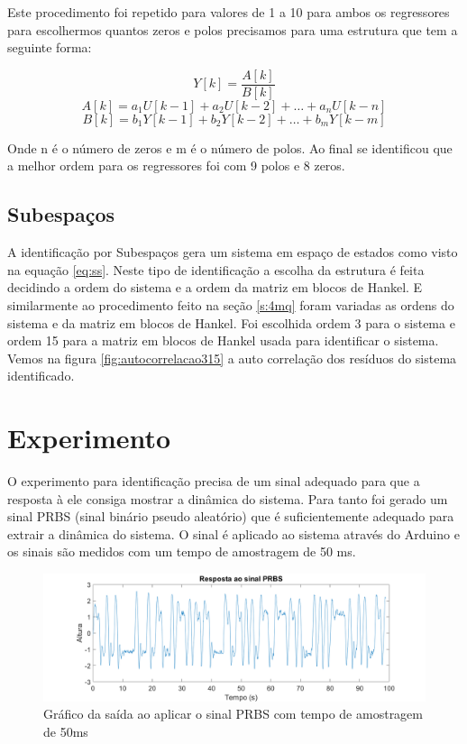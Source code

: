 Este procedimento foi repetido para valores de 1 a 10 para ambos os regressores para escolhermos quantos zeros e polos precisamos para uma estrutura que tem a seguinte forma:

\begin{equation}
Y[k]=\dfrac{A[k]}{B[k]}
\end{equation}
\begin{equation}
A[k]=a_1 U[k-1]+a_2 U[k-2]+ \dots + a_n U[k-n]
\end{equation}
\begin{equation}
B[k]=b_1 Y[k-1]+b_2 Y[k-2]+ \dots + b_m Y[k-m]
\end{equation}

Onde n é o número de zeros e m é o número de polos. Ao final se identificou que a melhor ordem para os regressores foi com 9 polos e 8 zeros.

\subsection{Subespaços}\label{s:4subespacos}
A identificação por Subespaços gera um sistema em espaço de estados como visto na equação \eqref{eq:ss}. Neste tipo de identificação a escolha da estrutura é feita decidindo a ordem do sistema e a ordem da matriz em blocos de Hankel. E similarmente ao procedimento feito na seção \ref{s:4mq} foram variadas as ordens do sistema e da matriz em blocos de Hankel.
Foi escolhida ordem 3 para o sistema e ordem 15 para a matriz em blocos de Hankel usada para identificar o sistema. Vemos na figura \ref{fig:autocorrelacao315} a auto correlação dos resíduos do sistema identificado.



\section{Experimento}\label{s:4experimento}
O experimento para identificação precisa de um sinal adequado para que a resposta à ele consiga mostrar a dinâmica do sistema. Para tanto foi gerado um sinal PRBS (sinal binário pseudo aleatório) que é suficientemente adequado para extrair a dinâmica do sistema. O sinal é aplicado ao sistema através do Arduino e os sinais são medidos com um tempo de amostragem de 50 ms.
\begin{figure}[H]
	\centering
	\includegraphics[width=1.1\linewidth]{sinalprbsid}
	\caption[Gráfico da saída PRBS]{Gráfico da saída ao aplicar o sinal PRBS com tempo de amostragem de 50ms}
	\label{fig:sinalprbsid}
\end{figure}

